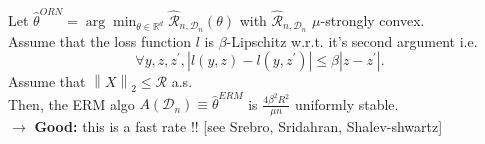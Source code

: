 \begin{thm}[]
    Let $ \hat{\theta }^{ORN} = \arg \min _{\theta \in \mathbb{R}^d} \hat{\mathcal{R}}_{n,\mathcal{D}_n} (\theta )$ with $ \hat{\mathcal{R}}_{n,\mathcal{D}_n} $  $ \mu  $-strongly convex. \\
    Assume that the loss function $ l  $ is $ \beta  $-Lipschitz w.r.t. it's second argument i.e.
    \[
        \forall y, z, z^\prime , \left| l(y,z) - l(y,z^\prime ) \right| \leq \beta \left| z - z^\prime  \right| 
    .\]
    Assume that $ \left\| X \right\| _2 \leq \mathcal{R} $ a.s. \\
    Then, the ERM algo $ A(\mathcal{D}_n) \equiv \hat{\theta }^{ERM} $   is $ \frac{4 \beta ^2 R^2}{\mu n} $ uniformly stable.\\ 
    $\rightarrow$ \textbf{Good:} this is a fast rate !! [see Srebro, Sridahran, Shalev-shwartz]
\end{thm}

